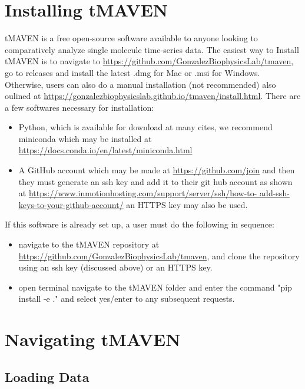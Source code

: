 \documentclass[11pt,a5paper,footinclude=true,headinclude=true]{scrbook} %
\begin{document}
	
	\tableofcontents 


    
\chapter{Installing tMAVEN}
tMAVEN is a free open-source software available to anyone looking to comparatively analyze single molecule time-series data. The easiest way to Install tMAVEN is to navigate to \url{https://github.com/GonzalezBiophysicsLab/tmaven}, go to releases and install the latest .dmg for Mac or .msi for Windows. 
\\


Otherwise, users can also do a manual installation (not recommended) also oulined at \url{https://gonzalezbiophysicslab.github.io/tmaven/install.html}. There are a few softwares necessary for installation: 
\begin{itemize}
    \item Python, which is available for download at many cites, we recommend miniconda which may be installed at \url{https://docs.conda.io/en/latest/miniconda.html}
    \item A GitHub account which may be made at \url{https://github.com/join} and then they must generate an ssh key and add it to their git hub account as shown at \url{https://www.inmotionhosting.com/support/server/ssh/how-to- add-ssh-keys-to-your-github-account/} an HTTPS key may also be used. 
    
\end{itemize}

If this software is already set up, a user must do the following in sequence: 
\begin{itemize}
    \item navigate to the tMAVEN repository at \url{https://github.com/GonzalezBiophysicsLab/tmaven}, and clone the repository using an ssh key (discussed above) or an HTTPS key.
    \item open terminal navigate to the tMAVEN folder and enter the command "pip install -e ." and select yes/enter to any subsequent requests.
\end{itemize} 
    
\chapter{Navigating tMAVEN}

\section{Loading Data}
    
\end{document}
